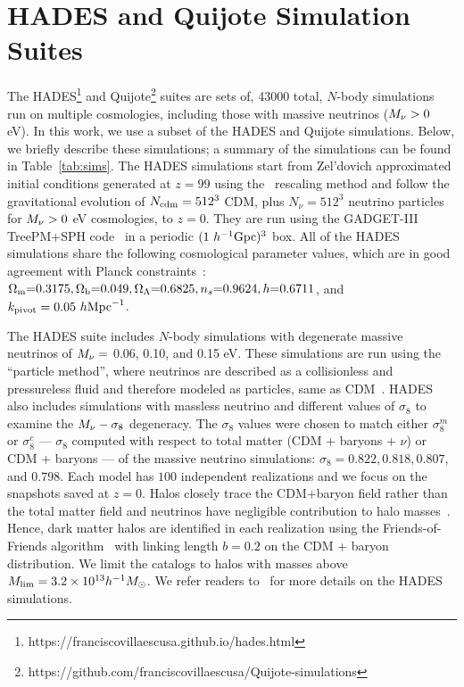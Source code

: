 \section{HADES and Quijote Simulation Suites} \label{sec:hades} 
The HADES\footnote{https://franciscovillaescusa.github.io/hades.html} and 
Quijote\footnote{https://github.com/franciscovillaescusa/Quijote-simulations}
suites are sets of, 43000 total, $N$-body simulations run on multiple cosmologies,
including those with massive neutrinos ($M_\nu > 0$ eV). In this work, 
we use a subset of the HADES and Quijote simulations. Below, we briefly describe these simulations; 
a summary of the simulations can be found in Table~\ref{tab:sims}. 
The HADES simulations start from Zel'dovich approximated initial conditions 
generated at $z=99$ using the~\cite{zennaro2017a} rescaling method and follow 
the gravitational evolution of $N_{\rm cdm}=512^3$ CDM, plus $N_{\nu}=512^3$ 
neutrino particles for $M_\nu > 0$ eV cosmologies, to $z=0$. They are run using 
the {\sc GADGET-III} TreePM+SPH code~\citep{springel2005} in a periodic 
$(1~h^{-1}{\rm Gpc})^3$ box. All of the HADES simulations share the following 
cosmological parameter values, which are in good agreement with Planck 
constraints~\cite{ade2016a}: $\Omega_{\rm m}{=}0.3175, \Omega_{\rm b}{=}0.049, \Omega_\Lambda{=}0.6825, n_s{=}0.9624, h{=}0.6711$, 
and $k_{\rm pivot} = 0.05~h{\rm Mpc}^{-1}$. 

The HADES suite includes $N$-body simulations with degenerate massive neutrinos 
of $M_\nu = $ 0.06, 0.10, and 0.15 eV. These simulations are run using the 
``particle method'', where neutrinos are described as a collisionless 
and pressureless fluid and therefore modeled as particles, same as 
CDM~\citep{brandbyge2008,viel2010}. HADES also includes simulations with massless 
neutrino and different values of $\sigma_8$ to examine the $M_\nu-\sigma_8$ 
degeneracy. The $\sigma_8$ values were chosen to match either $\sigma_8^m$ or 
$\sigma_8^{c}$ --- $\sigma_8$ computed with respect to total matter 
(CDM + baryons + $\nu$) or CDM + baryons --- of the massive neutrino simulations: 
$\sigma_8 = 0.822, 0.818, 0.807$, and $0.798$. Each model has $100$ independent 
realizations and we focus on the snapshots saved at $z = 0$. Halos closely 
trace the CDM+baryon field rather than the total matter field and neutrinos 
have negligible contribution to halo masses~\citep[\emph{e.g.}][]{ichiki2012, castorina2014, loverde2014, villaescusa-navarro2014}.
Hence, dark matter halos are identified in each realization using the Friends-of-Friends 
algorithm~\cite[FoF;][]{davis1985} with linking length $b=0.2$ on the CDM + baryon
distribution. We limit the catalogs to halos with masses above 
$M_{\rm lim} = 3.2\times 10^{13} h^{-1}M_\odot$. We refer readers
to~\cite{villaescusa-navarro2018} for more details on the HADES simulations. 


